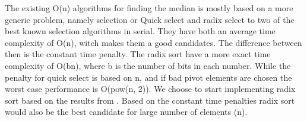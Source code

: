 

The existing O(n) algorithms for finding the median is mostly based on a more generic problem, namely selection or 
Quick select and radix select to two of the best known selection algorithms in serial. They have both an average time complexity of O(n), witch makes them a good candidates. The difference between then is the constant time penalty. The radix sort have a more exact time complexity of O(bn), where b is the number of bits in each number. While the penalty for quick select is based on n, and if bad pivot elements are chosen the worst case performance is O(pow(n, 2)). We choose to start implementing radix sort based on the results from 
. Based on the constant time penalties radix sort would also be the best candidate for large number of elements (n).


